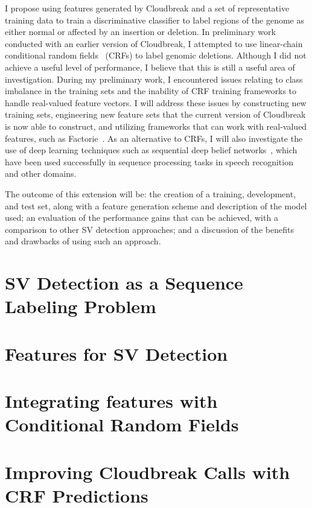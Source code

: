 \documentclass [11pt] {report}
\begin{document}
I propose using features generated by Cloudbreak and a set of representative training data to train a discriminative classifier to label regions of the genome as either normal or affected by an insertion or deletion. In preliminary work conducted with an earlier version of Cloudbreak, I attempted to use linear-chain conditional random fields~\cite{Lafferty:2001:CRF:645530.655813} (CRFs) to label genomic deletions. Although I did not achieve a useful level of performance, I believe that this is still a useful area of investigation. During my preliminary work, I encountered issues relating to class imbalance in the training sets and the inability of CRF training frameworks to handle real-valued feature vectors. I will address these issues by constructing new training sets, engineering new feature sets that the current version of Cloudbreak is now able to construct, and utilizing frameworks that can work with real-valued features, such as Factorie~\cite{mccallum09:factorie}. As an alternative to CRFs, I will also investigate the use of deep learning techniques such as sequential deep belief networks~\cite{andrew2012:sdbn}, which have been used successfully in sequence processing tasks in speech recognition and other domains.

The outcome of this extension will be: the creation of a training, development, and test set, along with a feature generation scheme and description of the model used; an evaluation of the performance gains that can be achieved, with a comparison to other SV detection approaches; and a discussion of the benefits and drawbacks of using such an approach.

\section{SV Detection as a Sequence Labeling Problem}

\section{Features for SV Detection}

\section{Integrating features with Conditional Random Fields}

\section{Improving Cloudbreak Calls with CRF Predictions}
\end{document}
